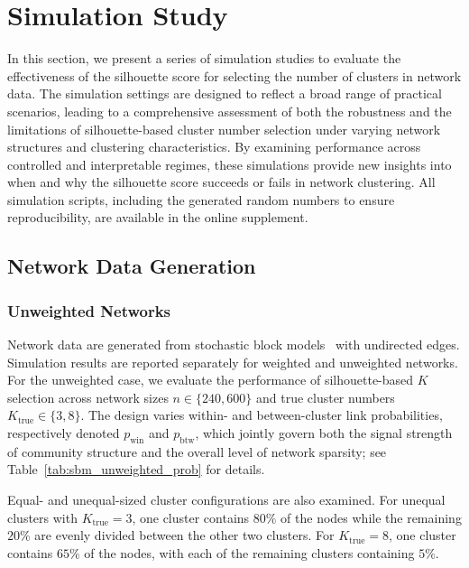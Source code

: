 \documentclass[12pt, titlepage, reqno]{article}
\begin{document}
\section{Simulation Study}
\label{sec:sim}


In this section, we present a series of simulation studies to 
evaluate the effectiveness of the silhouette score for selecting the 
number of clusters in network data. The simulation settings are 
designed to reflect a broad range of practical scenarios, leading to 
a comprehensive assessment of both the robustness and the limitations 
of silhouette-based cluster number selection under varying network 
structures and clustering characteristics. By examining performance 
across controlled and interpretable regimes, these simulations 
provide new insights into when and why the silhouette score succeeds 
or fails in network clustering. All simulation scripts, including the 
generated random numbers to ensure reproducibility, are available in 
the online supplement.


\subsection{Network Data Generation}
\label{sec:data_gen}


\subsubsection{Unweighted Networks}
\label{sec:unweighted}

Network data are generated from stochastic block 
models~\citep[SBM,][]{holland1983stochastic,abbe2018community} with 
undirected edges. Simulation results are reported separately for 
weighted and unweighted networks. For the unweighted case, we 
evaluate the performance of silhouette-based $K$ selection across 
network sizes $n \in \{240,600\}$ and true cluster numbers 
$K_{\text{true}} \in \{3,8\}$. The design varies within- and 
between-cluster link probabilities, respectively denoted 
$p_{\text{win}}$ and $p_{\text{btw}}$, which jointly govern both 
the signal strength of community structure and the overall level of 
network sparsity; see Table~\ref{tab:sbm_unweighted_prob} for 
details. 


Equal- and unequal-sized cluster configurations are also examined. 
For unequal clusters with $K_{\text{true}} = 3$, one cluster contains 
$80\%$ of the nodes while the remaining $20\%$ are evenly divided 
between the other two clusters. For $K_{\text{true}} = 8$, one 
cluster contains $65\%$ of the nodes, with each of the remaining 
clusters containing $5\%$. 
\end{document}
